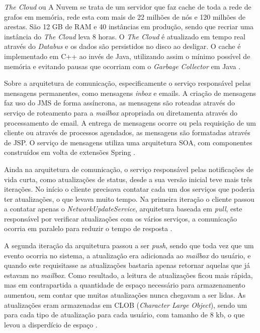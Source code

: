 \documentclass[diss]{template/setrem}
\begin{document}
\emph{The Cloud} ou A Nuvem se trata de um servidor que faz cache de toda a rede de grafos em memória, rede esta com mais de 22 milhões de nós e 120 milhões de arestas. São 12 GB de RAM e 40 instâncias em produção, sendo que recriar uma instância do \emph{The Cloud} leva 8 horas. O \emph{The Cloud} é atualizado em tempo real através do \emph{Databus} e os dados são persistidos no disco ao desligar. O cache é implementado em C++ ao invés de Java, utilizando assim o mínimo possível de memória e evitando pausas que ocorriam com o \emph{Garbage Collector} em Java \citep{Hurvitz2008}.

Sobre a arquitetura de comunicação, especificamente o serviço responsável pelas mensagens permanentes, como mensagens \emph{inbox} e emails. A criação de mensagens faz uso do JMS de forma assíncrona, as mensagens são roteadas através do serviço de roteamento para a \emph{mailbox} apropriada ou diretamenta através do processamento de email. A entrega de mensagens ocorre ou pela requisição de um cliente ou através de processos agendados, as mensagens são formatadas através de JSP. O serviço de mensagens utiliza uma arquitetura SOA, com componentes construídos em volta de extensões Spring \citep{Hurvitz2008}.

Ainda na arquitetura de comunicação, o serviço responsável pelas notificações de vida curta, como atualizações de status, desde a sua versão inicial teve mais três iterações. No início o cliente precisava contatar cada um dos serviços que poderia ter atualizações, o que levava muito tempo. Na primeira iteração o cliente passou a contatar apenas o \emph{NetworkUpdateService}, arquitetura baseada em \emph{pull}, este responsável por verificar atualizações com os vários serviços, a comunicação ocorria em paralelo para reduzir o tempo de resposta \citep{Hurvitz2008}.

A segunda iteração da arquitetura passou a ser \emph{push}, sendo que toda vez que um evento ocorria no sistema, a atualização era adicionada ao \emph{mailbox} do usuário, e quando este requisitasse as atualizações bastaria apenas retornar aquelas que já estavam no \emph{mailbox}. Como resultado, a leitura de atualizações ficou mais rápida, mas em contrapartida a quantidade de espaço necessário para armazenamento aumentou, sem contar que muitas atualizações nunca chegavam a ser lidas. As atualizações eram armazenadas em CLOB (\emph{Character Large Object}), sendo um para cada tipo de atualização para cada usuário, com tamanho de 8 kb, o que levou a disperdício de espaço \citep{Hurvitz2008}.
\end{document}
